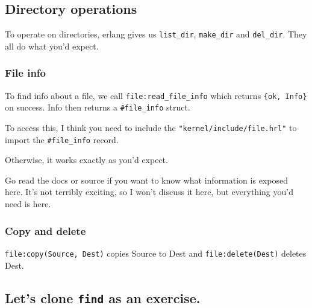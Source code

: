 \documentclass[11pt]{article}
\begin{document}
\subsection{Directory operations}
\label{sec:org09699c0}
To operate on directories, erlang gives us \texttt{list\_dir}, \texttt{make\_dir}
and \texttt{del\_dir}. They all do what you'd expect.


\subsubsection{File info}
\label{sec:org1b62343}
To find info about a file, we call \texttt{file:read\_file\_info} which
returns \texttt{\{ok, Info\}} on success. Info then returns a \texttt{\#file\_info}
struct.

To access this, I think you need to include the
\texttt{"kernel/include/file.hrl"} to import the \texttt{\#file\_info} record.

Otherwise, it works exactly as you'd expect. 

Go read the docs or source if you want to know what information is
exposed here. It's not terribly exciting, so I won't discuss it
here, but everything you'd need is here.

\subsubsection{Copy and delete}
\label{sec:org83bb6ad}
\texttt{file:copy(Source, Dest)} copies Source to Dest and
\texttt{file:delete(Dest)} deletes Dest.


\subsection{Let's clone \texttt{find} as an exercise.}
\label{sec:org89dfaec}
\end{document}
